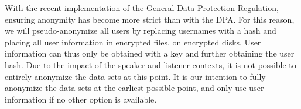 \noindent With the recent implementation of the General Data Protection Regulation, ensuring anonymity has become more strict than with the DPA. For this reason, we will pseudo-anonymize all users by replacing usernames with a hash and placing all user information in encrypted files, on encrypted disks. User information can thus only be obtained with a key and further obtaining the user hash. Due to the impact of the speaker and listener contexts, it is not possible to entirely anonymize the data sets at this point. It is our intention to fully anonymize the data sets at the earliest possible point, and only use user information if no other option is available.

%

